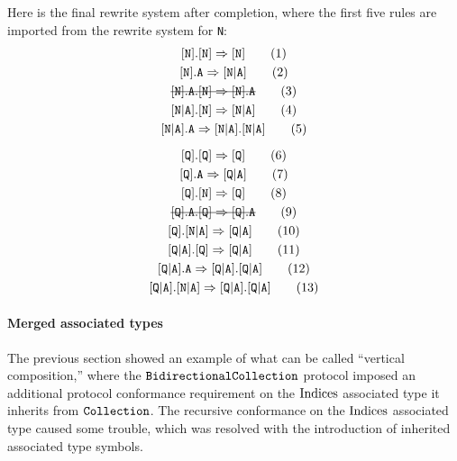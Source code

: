 \documentclass[../generics]{subfiles}
\begin{document}
Here is the final rewrite system after completion, where the first five rules are imported from the rewrite system for \texttt{N}:
\begin{gather*}
\protosym{N}.\protosym{N}\Rightarrow\protosym{N}\tag{1}\\
\protosym{N}.\texttt{A}\Rightarrow\assocsym{N}{A}\tag{2}\\
\text{\sout{$\protosym{N}.\texttt{A}.\protosym{N}\Rightarrow\protosym{N}.\texttt{A}$}}\tag{3}\\
\assocsym{N}{A}.\protosym{N}\Rightarrow\assocsym{N}{A}\tag{4}\\
\assocsym{N}{A}.\texttt{A}\Rightarrow\assocsym{N}{A}.\assocsym{N}{A}\tag{5}\\[\medskipamount]
\protosym{Q}.\protosym{Q}\Rightarrow\protosym{Q}\tag{6}\\
\protosym{Q}.\texttt{A}\Rightarrow\assocsym{Q}{A}\tag{7}\\
\protosym{Q}.\protosym{N}\Rightarrow\protosym{Q}\tag{8}\\
\text{\sout{$\protosym{Q}.\texttt{A}.\protosym{Q}\Rightarrow\protosym{Q}.\texttt{A}$}}\tag{9}\\
\protosym{Q}.\assocsym{N}{A}\Rightarrow\assocsym{Q}{A}\tag{10}\\
\assocsym{Q}{A}.\protosym{Q}\Rightarrow\assocsym{Q}{A}\tag{11}\\
\assocsym{Q}{A}.\texttt{A}\Rightarrow\assocsym{Q}{A}.\assocsym{Q}{A}\tag{12}\\
\assocsym{Q}{A}.\assocsym{N}{A}\Rightarrow\assocsym{Q}{A}.\assocsym{Q}{A}\tag{13}
\end{gather*}

\paragraph{Merged associated types}
The previous section showed an example of what can be called ``vertical composition,'' where the $\texttt{BidirectionalCollection}$ protocol imposed an additional protocol conformance requirement on the $\mathrm{Indices}$ associated type it inherits from $\texttt{Collection}$. The recursive conformance on the $\mathrm{Indices}$ associated type caused some trouble, which was resolved with the introduction of inherited associated type symbols.
\end{document}
